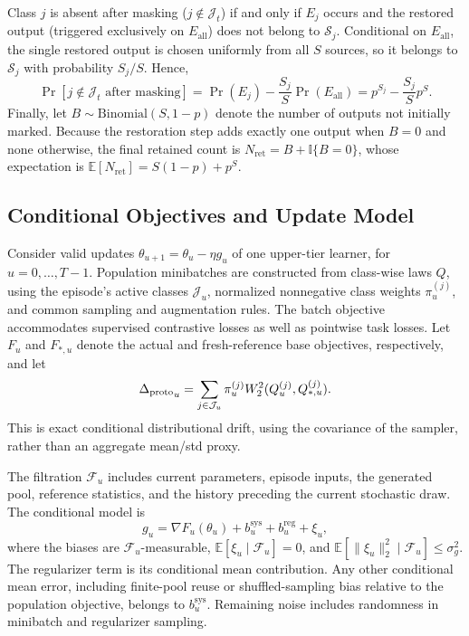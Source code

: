 Class $j$ is absent after masking ($j\notin\mathcal J_t$) if and only if $E_j$ occurs and the restored output (triggered exclusively on $E_{\mathrm{all}}$) does not belong to $\mathcal S_j$. Conditional on $E_{\mathrm{all}}$, the single restored output is chosen uniformly from all $S$ sources, so it belongs to $\mathcal S_j$ with probability $S_j/S$. Hence,
\begin{equation}
 \Pr[j\notin\mathcal J_t\text{ after masking}]
 = \Pr(E_j) - \frac{S_j}{S}\Pr(E_{\mathrm{all}})
 = p^{S_j} - \frac{S_j}{S}p^S.
\end{equation}
Finally, let $B\sim\mathrm{Binomial}(S,1-p)$ denote the number of outputs not initially marked. Because the restoration step adds exactly one output when $B=0$ and none otherwise, the final retained count is $N_{\mathrm{ret}} = B + \mathbb I\{B=0\}$, whose expectation is $\mathbb E[N_{\mathrm{ret}}] = S(1-p) + p^S$.

\subsection{Conditional Objectives and Update Model}

Consider valid updates $\theta_{u+1}=\theta_u-\eta g_u$ of one upper-tier learner, for $u=0,\ldots,T-1$. Population minibatches are constructed from class-wise laws $Q$, using the episode's active classes $\mathcal J_u$, normalized nonnegative class weights $\pi_u^{(j)}$, and common sampling and augmentation rules. The batch objective accommodates supervised contrastive losses as well as pointwise task losses. Let $F_u$ and $F_{*,u}$ denote the actual and fresh-reference base objectives, respectively, and let
\begin{equation}
 {\Delta_{\mathrm{proto}}}_u=\sum_{j\in\mathcal J_u}\pi_u^{(j)}
 W_2^2(Q_u^{(j)},Q_{*,u}^{(j)}).
\end{equation}
This is exact conditional distributional drift, using the covariance of the sampler, rather than an aggregate mean/std proxy.

The filtration $\mathcal F_u$ includes current parameters, episode inputs, the generated pool, reference statistics, and the history preceding the current stochastic draw. The conditional model is
\begin{equation}
 g_u=\nabla F_u(\theta_u)+b_u^{\mathrm{sys}}
 +b_u^{\mathrm{reg}}+\xi_u,
\end{equation}
where the biases are $\mathcal F_u$-measurable,
$\mathbb E[\xi_u\mid\mathcal F_u]=0$, and
$\mathbb E[\|\xi_u\|_2^2\mid\mathcal F_u]\le\sigma_g^2$.
The regularizer term is its conditional mean contribution. Any other conditional mean error, including finite-pool reuse or shuffled-sampling bias relative to the population objective, belongs to $b_u^{\mathrm{sys}}$. Remaining noise includes randomness in minibatch and regularizer sampling.

